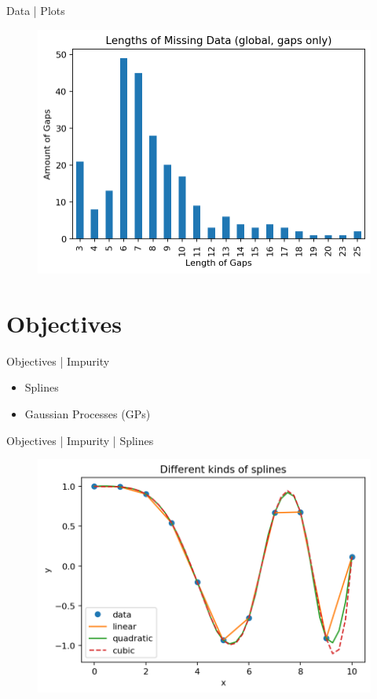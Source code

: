 \documentclass{beamer}
\begin{document}
    \begin{frame}{Data | Plots}
        \begin{figure}[hbt]
        	\center
        	\includegraphics[width=1.0\textwidth]{img/length_missing_data.png}
        	\label{fig:length_missing_data}
        \end{figure}
    \end{frame}
    
    \section{Objectives}
    \begin{frame}{Objectives | Impurity}
        \begin{itemize}
            \item Splines
            \item Gaussian Processes (GPs)
        \end{itemize}
    \end{frame}
    
    \begin{frame}{Objectives | Impurity | Splines}
        \begin{figure}[hbt]
        	\center
        	\includegraphics[width=1.0\textwidth]{img/splines.png}
        	\label{fig:splines}
        \end{figure}
    \end{frame}
    
\end{document}
